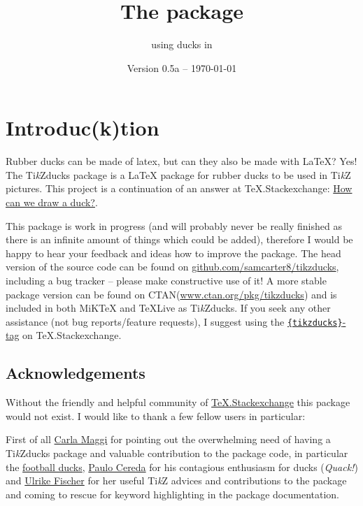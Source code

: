 \documentclass[parskip=half]{scrartcl}
\title{The \texorpdfstring{\tikzducks}{tikzducks} package}
\subtitle{using ducks in \TikZ}
\author{%
	\texorpdfstring{\texttt{samcarter} (alias 
		\tikzset{external/export=false}%
		\begin{tikzpicture}[scale=0.3,baseline=3pt]
			\duck[body=yellow!50!brown!50!white,
					longhair=red!50!brown, 
					jacket=blue!50!black]
		\end{tikzpicture})\\[0.8em]
		\url{https://github.com/samcarter8/tikzducks}\\
		\url{https://www.ctan.org/pkg/tikzducks}
	}{samcarter}}
\date{Version 0.5a -- \today}
\newcommand{\CTAN}{\textsc{CTAN}\xspace}
\newcommand{\TikZ}{Ti\emph{k}Z\xspace}
\newcommand{\tikzducks}{Ti\emph{k}Zducks\xspace}
\newcommand{\miktex}{MiK\TeX\xspace}
\newcommand{\texlive}{\TeX{}Live\xspace}
\begin{document}
\maketitle
\thispagestyle{scrheadings}

\section{Introduc(k)tion}
\label{intro}

Rubber ducks can be made of latex, but can they also be made with \LaTeX? Yes! The \tikzducks package is a \LaTeX{} package for rubber ducks to be used in \TikZ pictures. 
This project is a continuation of an answer at TeX.Stackexchange: \href{tex.stackexchange.com/a/347458/36296}{How can we draw a duck?}.

This package is work in progress (and will probably never be really finished as there is an infinite amount of things which could be added), therefore I would be happy to hear your feedback and ideas how to improve the package. 
The head version of the source code can be found on \url{github.com/samcarter8/tikzducks}, including a bug tracker -- please make constructive use of it! A more stable package version can be found on \CTAN (\url{www.ctan.org/pkg/tikzducks}) and is included in both \miktex and \texlive as \tikzducks. If you seek any other assistance (not bug reports/feature requests), I suggest using the \href{https://tex.stackexchange.com/questions/tagged/tikzducks}{\texttt{\{tikzducks\}}-tag} on TeX.Stackexchange.

\subsection{Acknowledgements}

Without the friendly and helpful community of \href{https://tex.stackexchange.com/}{TeX.Stackexchange} this package would not exist. I would like to thank a few fellow users in particular:

First of all 
%
\href{https://tex.stackexchange.com/users/101651/carlatex}{Carla Maggi} for pointing out the overwhelming need of having a \tikzducks package and valuable contribution to the package code, in particular the \hyperref[sec:footballducks]{football ducks},
%
\href{https://tex.stackexchange.com/users/3094/paulo-cereda}{Paulo Cereda} for his contagious enthusiasm for ducks (\emph{Quack!}) and
%
\href{https://tex.stackexchange.com/users/2388/ulrike-fischer}{Ulrike Fischer} for her useful \TikZ advices and contributions to the package and coming to rescue for keyword highlighting in the package documentation.
\end{document}
